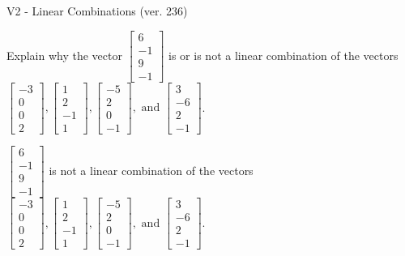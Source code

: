 \begin{exercise}
  \begin{exerciseTitle}V2 - Linear Combinations (ver. 236)\end{exerciseTitle}
  \begin{exerciseStatement}
    Explain why the vector \(\left[\begin{array}{c}
6 \\
-1 \\
9 \\
-1
\end{array}\right]\)  is or is not a linear 
	combination of the vectors \(\left[\begin{array}{c}
-3 \\
0 \\
0 \\
2
\end{array}\right] , \left[\begin{array}{c}
1 \\
2 \\
-1 \\
1
\end{array}\right] , \left[\begin{array}{c}
-5 \\
2 \\
0 \\
-1
\end{array}\right] , \text{ and } \left[\begin{array}{c}
3 \\
-6 \\
2 \\
-1
\end{array}\right]\).
	


  \end{exerciseStatement}
  \begin{exerciseAnswer}
   \(\left[\begin{array}{c}
6 \\
-1 \\
9 \\
-1
\end{array}\right]\) 
  	 is not  
	a linear combination of the vectors \(\left[\begin{array}{c}
-3 \\
0 \\
0 \\
2
\end{array}\right] , \left[\begin{array}{c}
1 \\
2 \\
-1 \\
1
\end{array}\right] , \left[\begin{array}{c}
-5 \\
2 \\
0 \\
-1
\end{array}\right] , \text{ and } \left[\begin{array}{c}
3 \\
-6 \\
2 \\
-1
\end{array}\right]\).


\end{exerciseAnswer}
\end{exercise}
